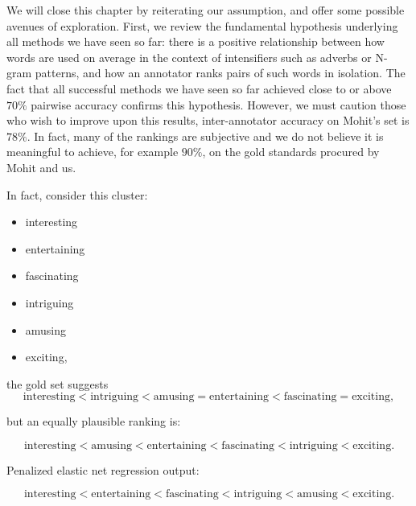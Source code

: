 We will close this chapter by reiterating our assumption, and offer some possible avenues of exploration. First, we review the fundamental hypothesis underlying all methods we have seen so far: there is a positive relationship between how words are used on average in the context of intensifiers such as adverbs or N-gram patterns, and how an annotator ranks pairs of such words in isolation. The fact that all successful methods we have seen so far achieved close to or above $70\%$ pairwise accuracy confirms this hypothesis. However, we must caution those who wish to improve upon this results, inter-annotator accuracy on Mohit's set is $78\%$. In fact, many of the rankings are subjective and we do not believe it is meaningful to achieve, for example $90\%$, on the gold standards procured by Mohit and us. 

In fact, consider this cluster: 

\begin{itemize}
\item interesting
\item entertaining
\item fascinating
\item intriguing
\item amusing
\item exciting,
\end{itemize}

the gold set suggests
	\[
		\text{interesting} < \text{intriguing} < \text{amusing} = \text{entertaining} < \text{fascinating} = \text{exciting},
	\]

but an equally plausible ranking is:

	\[
		\text{interesting} < \text{amusing} < \text{entertaining} < \text{fascinating} < \text{intriguing} < \text{exciting}.
	\]

Penalized elastic net regression output:

	\[
		\text{interesting} < \text{entertaining} < \text{fascinating} < \text{intriguing} < \text{amusing} < \text{exciting}.
	\]

